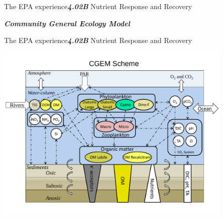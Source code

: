 \documentclass[serif]{beamer}\usepackage[]{graphicx}\usepackage[]{color}
\newcommand{\emtxt}[1]{\textbf{\textit{#1}}}
\begin{document}
\begin{frame}{The EPA experience}{\emtxt{4.02B} Nutrient Response and Recovery}
\centerline{\emtxt{Community General Ecology Model}}
\vspace{0.1in}
\centerline{}
\end{frame}

\begin{frame}{The EPA experience}{\emtxt{4.02B} Nutrient Response and Recovery}
\vspace{0.15in}
\centerline{\includegraphics[trim= 0cm 0cm 0cm 2cm, clip=true,width=0.85\textwidth]{fig/CGEM.pdf}}
\end{frame}
\end{document}
